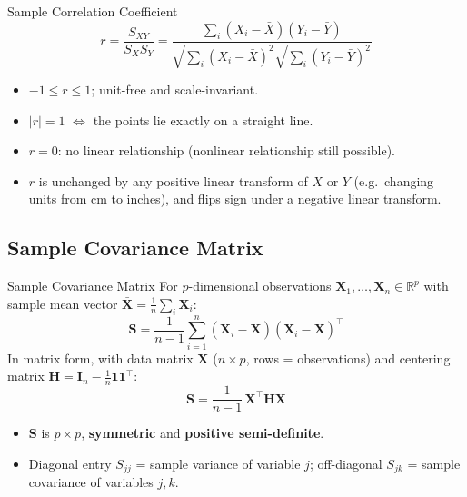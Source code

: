 \documentclass[11pt,aspectratio=169]{beamer}
\newcommand{\Xbar}{\bar{X}}
\begin{document}
\begin{frame}{Sample Correlation Coefficient}
\[
    r = \frac{S_{XY}}{S_X S_Y} =
    \frac{\sum_i (X_i-\Xbar)(Y_i-\bar Y)}
         {\sqrt{\sum_i(X_i-\Xbar)^2}\sqrt{\sum_i(Y_i-\bar Y)^2}}
\]
\begin{itemize}
    \item $-1 \le r \le 1$; unit-free and scale-invariant.
    \item $|r|=1$ $\Leftrightarrow$ the points lie exactly on a straight
          line.
    \item $r=0$: no linear relationship (nonlinear relationship still
          possible).
    \item $r$ is unchanged by any positive linear transform of $X$ or $Y$
          (e.g.\ changing units from cm to inches), and flips sign under a
          negative linear transform.
\end{itemize}
\end{frame}

\subsection{Sample Covariance Matrix}

\begin{frame}{Sample Covariance Matrix}
For $p$-dimensional observations $\mathbf X_1,\dots,\mathbf X_n \in
\mathbb R^p$ with sample mean vector
$\bar{\mathbf X}=\frac1n\sum_i \mathbf X_i$:
\[
    \mathbf S = \frac{1}{n-1}\sum_{i=1}^n
    (\mathbf X_i-\bar{\mathbf X})(\mathbf X_i-\bar{\mathbf X})^\top
\]
In matrix form, with data matrix $\mathbf X$ ($n\times p$, rows =
observations) and centering matrix
$\mathbf H = \mathbf I_n - \frac1n \mathbf 1\mathbf 1^\top$:
\[
    \mathbf S = \frac{1}{n-1}\,\mathbf X^\top \mathbf H \mathbf X
\]
\begin{itemize}
    \item $\mathbf S$ is $p\times p$, \textbf{symmetric} and
          \textbf{positive semi-definite}.
    \item Diagonal entry $S_{jj}$ = sample variance of variable $j$;
          off-diagonal $S_{jk}$ = sample covariance of variables $j,k$.
\end{itemize}
\end{frame}
\end{document}
